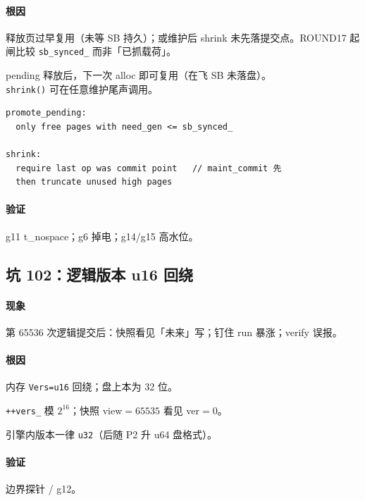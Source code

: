 \paragraph{根因}
释放页过早复用（未等 SB 持久）；或维护后 shrink 未先落提交点。ROUND17 起闸比较 \texttt{sb\_synced\_} 而非「已抓载荷」。

\begin{fixold}
pending 释放后，下一次 alloc 即可复用（在飞 SB 未落盘）。\\
\texttt{shrink()} 可在任意维护尾声调用。
\end{fixold}

\begin{fixnew}
\begin{lstlisting}[language=pseudo]
promote_pending:
  only free pages with need_gen <= sb_synced_

shrink:
  require last op was commit point   // maint_commit 先
  then truncate unused high pages
\end{lstlisting}
\end{fixnew}

\paragraph{验证}
g11 t\_nospace；g6 掉电；g14/g15 高水位。

\subsection{坑 102：逻辑版本 u16 回绕}
\paragraph{现象}
第 65536 次逻辑提交后：快照看见「未来」写；钉住 run 暴涨；verify 误报。

\paragraph{根因}
内存 \texttt{Vers=u16} 回绕；盘上本为 32 位。

\begin{fixold}
\texttt{++vers\_} 模 $2^{16}$；快照 view$=65535$ 看见 ver$=0$。
\end{fixold}

\begin{fixnew}
引擎内版本一律 \texttt{u32}（后随 P2 升 u64 盘格式）。
\end{fixnew}

\paragraph{验证}
边界探针 / g12。

